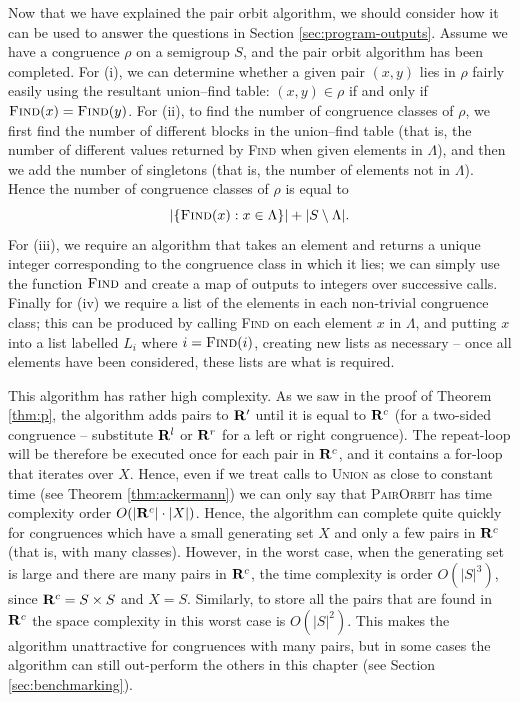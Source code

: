 Now that we have explained the pair orbit algorithm, we should consider how it
can be used to answer the questions in Section \ref{sec:program-outputs}.
Assume we have a congruence $\rho$ on a semigroup $S$, and the pair orbit
algorithm has been completed.  For (i), we can determine whether a given pair $(x,y)$
lies in $\rho$ fairly easily using the resultant union--find table: $(x,y) \in
\rho$ if and only if $\textsc{Find}(x) = \textsc{Find}(y)$.  For (ii), to find the number
of congruence classes of $\rho$, we first find the number of different blocks in
the union--find table (that is, the number of different values returned by
\textsc{Find} when given elements in $\Lambda$), and then we add the number of
singletons (that is, the number of elements not in $\Lambda$).  Hence the number
of congruence classes of $\rho$ is equal to
$$|\{\textsc{Find}(x): x \in \Lambda\}| + |S \setminus \Lambda|.$$
For (iii), we require an algorithm that takes an element and returns a unique
integer corresponding to the congruence class in which it lies; we can simply
use the function $\textsc{Find}$ and create a map of outputs to integers over
successive calls.  Finally for (iv) we require a list of the
elements in each non-trivial congruence class; this can be produced by calling
\textsc{Find} on each element $x$ in $\Lambda$, and putting $x$ into a list
labelled $L_i$ where $i = \textsc{Find}(i)$, creating new lists as necessary --
once all elements have been considered, these lists are what is required.

This algorithm has rather high complexity.  As we saw in the proof of Theorem
\ref{thm:p}, the algorithm adds pairs to $\mathbf{R}'$ until it is equal to $\mathbf{R}^c$ (for
a two-sided congruence -- substitute $\mathbf{R}^l$ or $\mathbf{R}^r$ for a left or right
congruence).  The repeat-loop will be therefore be executed once for each pair
in $\mathbf{R}^c$, and it contains a for-loop that iterates over $X$.  Hence, even if we
treat calls to \textsc{Union} as close to constant time (see Theorem
\ref{thm:ackermann}) we can only say that \textsc{PairOrbit} has time complexity
order $O(|\mathbf{R}^c| \cdot |X|)$.  Hence, the algorithm can complete quite quickly
for congruences which have a small generating set $X$ and only a few pairs in
$\mathbf{R}^c$ (that is, with many classes).  However, in the worst case, when the
generating set is large and there are many pairs in $\mathbf{R}^c$, the time complexity
is order $O(|S|^3)$, since $\mathbf{R}^c = S \times S$ and $X = S$.  Similarly, to store
all the pairs that are found in $\mathbf{R}^c$ the space complexity in this worst case
is $O(|S|^2)$.  This makes the algorithm unattractive for congruences with many
pairs, but in some cases the algorithm can still out-perform the others in this
chapter (see Section \ref{sec:benchmarking}).

